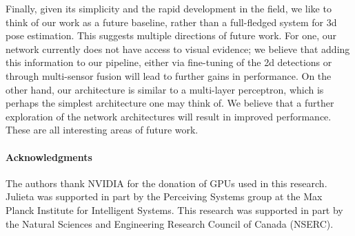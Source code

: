 \documentclass[10pt,twocolumn,letterpaper]{article}
\begin{document}
Finally, given its simplicity and the rapid development in the field, we like to think of our work as a future baseline, rather than a full-fledged system for 3d pose estimation. This suggests multiple directions of future work. For one, our network currently does not have access to visual evidence; we believe that adding this information to our pipeline, either via fine-tuning of the 2d detections or through multi-sensor fusion will lead to further gains in performance. On the other hand, our architecture is similar to a multi-layer perceptron, which is perhaps the simplest architecture one may think of. We believe that a further exploration of the network architectures will result in improved performance. These are all interesting areas of future work.

\paragraph{Acknowledgments} The authors thank NVIDIA for the donation of GPUs used in this research.
Julieta was supported in part by the Perceiving Systems group at the Max Planck Institute for Intelligent Systems.
This research was supported in part by the Natural Sciences and Engineering Research Council of Canada (NSERC).

{\small

\balance

}
\end{document}
